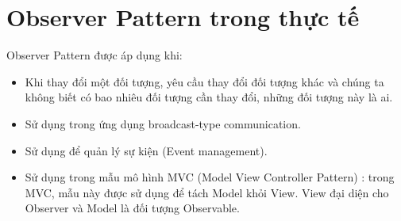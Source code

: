 \section{Observer Pattern trong thực tế}
Observer Pattern được áp dụng khi:

\begin{itemize}
	\item Khi thay đổi một đối tượng, yêu cầu thay đổi đối tượng khác và chúng ta không biết có bao nhiêu đối tượng cần thay đổi, những đối tượng này là ai.\\
	\item Sử dụng trong ứng dụng broadcast-type communication.\\
	\item Sử dụng để quản lý sự kiện (Event management).\\
	\item Sử dụng trong mẫu mô hình MVC (Model View Controller Pattern) : trong MVC, mẫu này được sử dụng để tách Model khỏi View. View đại diện cho Observer và Model là đối tượng Observable.
\end{itemize}


